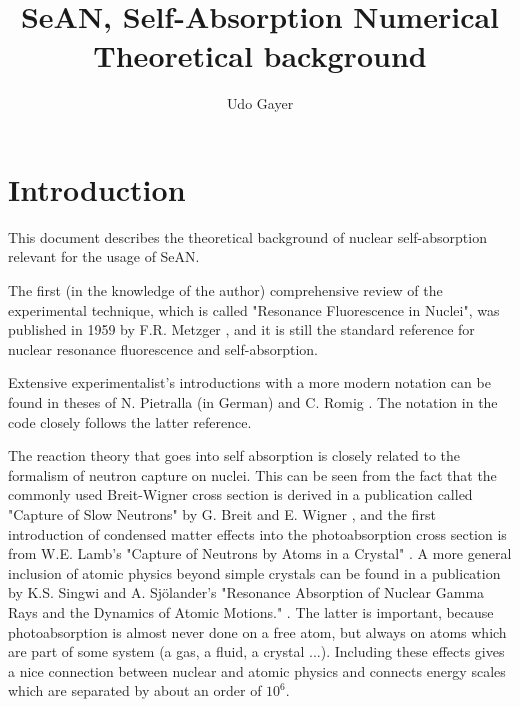 \documentclass{article}
\begin{document}
\title{SeAN, Self-Absorption Numerical \\ Theoretical background}
\author{Udo Gayer}
\date{}
\maketitle

\newpage

\tableofcontents

\newpage

\section{Introduction}
This document describes the theoretical background of nuclear self-absorption relevant for the usage of SeAN. 

The first (in the knowledge of the author) comprehensive review of the experimental technique, which is called "Resonance Fluorescence in Nuclei", was published in 1959 by F.R. Metzger \cite{Met59}, and it is still the standard reference for nuclear resonance fluorescence and self-absorption.

Extensive experimentalist's introductions with a more modern notation can be found in theses of N. Pietralla \cite{Pie93} (in German) and C. Romig \cite{Rom15}. 
The notation in the code closely follows the latter reference.

The reaction theory that goes into self absorption is closely related to the formalism of neutron capture on nuclei. 
This can be seen from the fact that the commonly used Breit-Wigner cross section is derived in a publication called "Capture of Slow Neutrons" by G. Breit and E. Wigner \cite{Bre36}, and the first introduction of condensed matter effects into the photoabsorption cross section is from W.E. Lamb's "Capture of Neutrons by Atoms in a Crystal" \cite{Lam39}. 
A more general inclusion of atomic physics beyond simple crystals can be found in a publication by K.S. Singwi and A. Sj\"olander's "Resonance Absorption of Nuclear Gamma Rays and the Dynamics of Atomic Motions." \cite{Sin60}.
The latter is important, because photoabsorption is almost never done on a free atom, but always on atoms which are part of some system (a gas, a fluid, a crystal ...).
Including these effects gives a nice connection between nuclear and atomic physics and connects energy scales which are separated by about an order of $10^6$.

\newpage
\end{document}
